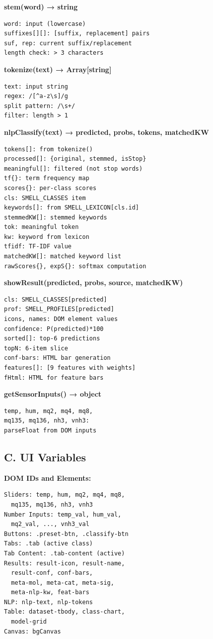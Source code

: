 \documentclass[10pt]{article}
\begin{document}
{\textbf{stem(word) → string}
\begin{verbatim}
word: input (lowercase)
suffixes[][]: [suffix, replacement] pairs
suf, rep: current suffix/replacement
length check: > 3 characters
\end{verbatim}

\textbf{tokenize(text) → Array[string]}
\begin{verbatim}
text: input string
regex: /[^a-z\s]/g
split pattern: /\s+/
filter: length > 1
\end{verbatim}

\textbf{nlpClassify(text) → {predicted, probs, tokens, matchedKW}}
\begin{verbatim}
tokens[]: from tokenize()
processed[]: {original, stemmed, isStop}
meaningful[]: filtered (not stop words)
tf{}: term frequency map
scores{}: per-class scores
cls: SMELL_CLASSES item
keywords[]: from SMELL_LEXICON[cls.id]
stemmedKW[]: stemmed keywords
tok: meaningful token
kw: keyword from lexicon
tfidf: TF-IDF value
matchedKW[]: matched keyword list
rawScores{}, expS{}: softmax computation
\end{verbatim}

\textbf{showResult(predicted, probs, source, matchedKW)}
\begin{verbatim}
cls: SMELL_CLASSES[predicted]
prof: SMELL_PROFILES[predicted]
icons, names: DOM element values
confidence: P(predicted)*100
sorted[]: top-6 predictions
topN: 6-item slice
conf-bars: HTML bar generation
features[]: [9 features with weights]
fHtml: HTML for feature bars
\end{verbatim}

\textbf{getSensorInputs() → object}
\begin{verbatim}
temp, hum, mq2, mq4, mq8, 
mq135, mq136, nh3, vnh3: 
parseFloat from DOM inputs
\end{verbatim}

\subsection*{C. UI Variables}

\textbf{DOM IDs and Elements:}
\begin{verbatim}
Sliders: temp, hum, mq2, mq4, mq8, 
  mq135, mq136, nh3, vnh3
Number Inputs: temp_val, hum_val, 
  mq2_val, ..., vnh3_val
Buttons: .preset-btn, .classify-btn
Tabs: .tab (active class)
Tab Content: .tab-content (active)
Results: result-icon, result-name,
  result-conf, conf-bars,
  meta-mol, meta-cat, meta-sig,
  meta-nlp-kw, feat-bars
NLP: nlp-text, nlp-tokens
Table: dataset-tbody, class-chart,
  model-grid
Canvas: bgCanvas
\end{verbatim}

}
\end{document}
